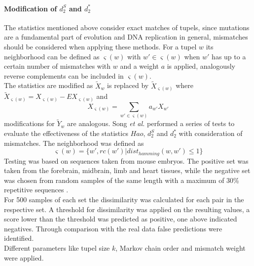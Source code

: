 \documentclass[twocolumn]{bmcart}%
\begin{document}
\paragraph*{Modification of $d_2^S$ and $d_2^*$}
The statistics mentioned above consider exact matches of tupels, since mutations are a fundamental part of evolution and DNA replication in general, mismatches should be considered when applying these methods. For a tupel $w$ its neighborhood can be defined as $\varsigma(w)$ with $w' \in \varsigma(w)$ when $w'$ has up to a certain number of mismatches with $w$ and a weight $a$ is applied, analogously reverse complements can be included in $\varsigma(w)$.\\
The statistics are modified as $\widetilde{X}_w$ is replaced by $\widetilde{X}_{\varsigma(w)}$ where $\widetilde{X}_{\varsigma(w)}=X_{\varsigma(w)}-EX_{\varsigma(w)}$ and 
$$X_{\varsigma(w)}=\sum_{w'\in\varsigma(w)}a_{w'}X_{w'}$$ 
modifications for $\widetilde{Y}_w$ are analogous.
Song \textit{et al.} performed a series of tests to evaluate the effectiveness of the statistics $Hao$, $d_2^S$ and $d_2^*$ with consideration of mismatches. The neighborhood was defined as $$\varsigma(w)=\{w',rc(w')|dist_{hamming}(w,w')\leq 1\}$$
Testing was based on sequences taken from mouse embryos. The positive set was taken from the forebrain, midbrain, limb and heart tissues, while the negative set was chosen from random samples of the same length with a maximum of 30\% repetitive sequences \cite{doi:10.1093/bib/bbt067}.\\
For 500 samples of each set the dissimilarity was calculated for each pair in the respective set. A threshold for dissimilarity was applied on the resulting values, a score lower than the threshold was predicted as positive, one above indicated negatives. Through comparison with the real data false predictions were identified.\\
Different parameters like tupel size $k$, Markov chain order and mismatch weight were applied.
\end{document}
